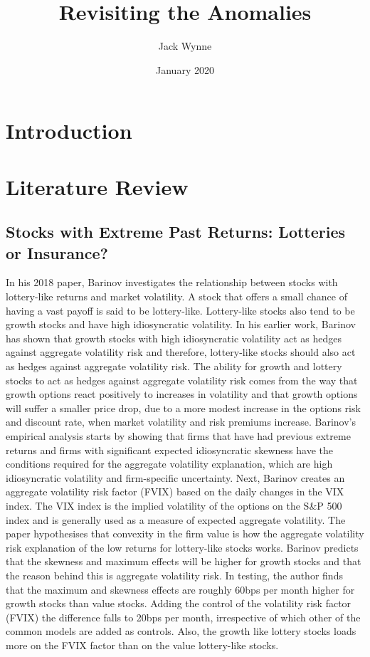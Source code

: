 \documentclass[a4paper]{article}                 %
\begin{document}
\title{Revisiting the Anomalies }
\author{Jack Wynne}
\date{January 2020}
\maketitle
\section{Introduction}
\section{Literature Review}
\subsection{Stocks with Extreme Past Returns: Lotteries or Insurance?}
In his 2018 paper, Barinov investigates the relationship between stocks with lottery-like returns and market volatility. A stock that offers a small chance of having a vast payoff is said to be lottery-like. Lottery-like stocks also tend to be growth stocks and have high idiosyncratic volatility. In his earlier work, Barinov has shown that growth stocks with high idiosyncratic volatility act as hedges against aggregate volatility risk and therefore, lottery-like stocks should also act as hedges against aggregate volatility risk. The ability for growth and lottery stocks to act as hedges against aggregate volatility risk comes from the way that growth options react positively to increases in volatility and that growth options will suffer a smaller price drop, due to a more modest increase in the options risk and discount rate, when market volatility and risk premiums increase. 
Barinov’s empirical analysis starts by showing that firms that have had previous extreme returns and firms with significant expected idiosyncratic skewness have the conditions required for the aggregate volatility explanation, which are high idiosyncratic volatility and firm-specific uncertainty. Next, Barinov creates an aggregate volatility risk factor (FVIX) based on the daily changes in the VIX index. The VIX index is the implied volatility of the options on the S\&P 500 index and is generally used as a measure of expected aggregate volatility. 
The paper hypothesises that convexity in the firm value is how the aggregate volatility risk explanation of the low returns for lottery-like stocks works. Barinov predicts that the skewness and maximum effects will be higher for growth stocks and that the reason behind this is aggregate volatility risk. In testing, the author finds that the maximum and skewness effects are roughly 60bps per month higher for growth stocks than value stocks. Adding the control of the volatility risk factor (FVIX) the difference falls to 20bps per month, irrespective of which other of the common models are added as controls. Also, the growth like lottery stocks loads more on the FVIX factor than on the value lottery-like stocks. 
\end{document}
